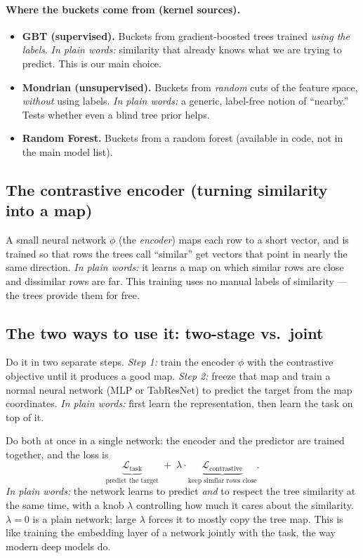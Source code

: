 \documentclass[11pt]{article}
\begin{document}
\paragraph{Where the buckets come from (kernel sources).}
\begin{itemize}[leftmargin=1.4em,itemsep=2pt]
  \item \textbf{GBT (supervised).} Buckets from gradient-boosted trees trained
  \emph{using the labels}. \textit{In plain words:} similarity that already knows
  what we are trying to predict. This is our main choice.
  \item \textbf{Mondrian (unsupervised).} Buckets from \emph{random} cuts of the
  feature space, \emph{without} using labels. \textit{In plain words:} a generic,
  label-free notion of ``nearby.'' Tests whether even a blind tree prior helps.
  \item \textbf{Random Forest.} Buckets from a random forest (available in code,
  not in the main model list).
\end{itemize}

\subsection{The contrastive encoder (turning similarity into a map)}
A small neural network $\phi$ (the \emph{encoder}) maps each row to a short
vector, and is trained so that rows the trees call ``similar'' get vectors that
point in nearly the same direction. \textit{In plain words:} it learns a map on
which similar rows are close and dissimilar rows are far. This training uses no
manual labels of similarity --- the trees provide them for free.

\subsection{The two ways to use it: two-stage vs.\ joint}
\begin{description}[leftmargin=2em,style=nextline]
  \item[\textbf{TKCE two-stage}] Do it in two separate steps. \emph{Step 1:} train
  the encoder $\phi$ with the contrastive objective until it produces a good map.
  \emph{Step 2:} freeze that map and train a normal neural network (MLP or
  TabResNet) to predict the target from the map coordinates. \textit{In plain
  words:} first learn the representation, then learn the task on top of it.
  \item[\textbf{TKCE joint}] Do both at once in a single network: the encoder and
  the predictor are trained together, and the loss is
  \[
  \underbrace{\mathcal{L}_{\text{task}}}_{\text{predict the target}}
  \;+\;\lambda\cdot
  \underbrace{\mathcal{L}_{\text{contrastive}}}_{\text{keep similar rows close}}.
  \]
  \textit{In plain words:} the network learns to predict \emph{and} to respect the
  tree similarity at the same time, with a knob $\lambda$ controlling how much it
  cares about the similarity. $\lambda=0$ is a plain network; large $\lambda$
  forces it to mostly copy the tree map. This is like training the embedding layer
  of a network jointly with the task, the way modern deep models do.
\end{description}
\end{document}
